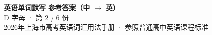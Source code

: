 \documentclass[10pt,a4paper]{article}
\begin{document}
\pagestyle{plain}

\begin{center}
{\LARGE\bfseries 英语单词默写 \quad 参考答案（中 $\to$ 英）}\\[0.22em]
{\large D 字母 · 第 2 / 6 份}\\[0.18em]
{\small 2026年上海市高考英语词汇用法手册 · 参照普通高中英语课程标准}
\end{center}

\vspace{0.2em}
\noindent{\color{rulegray}\rule{\textwidth}{0.8pt}}

\vspace{0.35em}

\vspace{0.25em}
\renewcommand{\arraystretch}{1.32}
\end{document}
